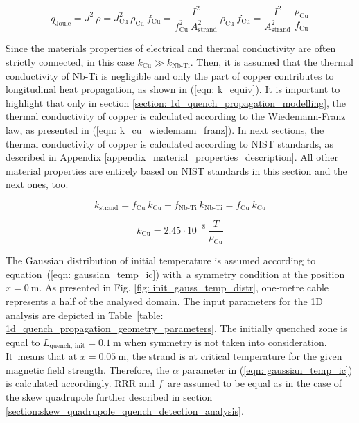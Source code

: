 \begin{equation}
    q_\text{Joule} = J^2~\rho = J_\text{Cu}^2~\rho_\text{Cu}~f_\text{Cu} = \frac{I^2}{f_\text{Cu}^2~A_\text{strand}^2}~\rho_\text{Cu}~f_\text{Cu} = \frac{I^2}{A_\text{strand}^2}~\frac{\rho_\text{Cu}}{f_\text{Cu}} 
    \label{eqn: p_dens_equiv}
\end{equation}

Since the materials properties of electrical and thermal conductivity are often strictly connected, in this case $k_\text{Cu} \gg k_\text{Nb-Ti}$. Then, it is assumed that the thermal conductivity of Nb-Ti is negligible and only the part of copper contributes to longitudinal heat propagation, as shown in (\ref{eqn: k_equiv}). It is important to highlight that only in section \ref{section: 1d_quench_propagation_modelling}, the thermal conductivity of copper is calculated according to the Wiedemann-Franz law, as presented in (\ref{eqn: k_cu_wiedemann_franz}). In next sections, the thermal conductivity of copper is calculated according to NIST standards, as described in Appendix \ref{appendix_material_properties_description}. All other material properties are entirely based on NIST standards in this section and the next ones, too.

\begin{equation}
    k_\text{strand} = f_\text{Cu} ~ k_\text{Cu} + f_\text{Nb-Ti} ~ k_\text{Nb-Ti} =  f_\text{Cu} ~ k_\text{Cu}
    \label{eqn: k_equiv}
\end{equation}

\begin{equation}
    k_\text{Cu} = 2.45 \cdot 10^{-8} ~ \frac{T}{\rho_\text{Cu}}
    \label{eqn: k_cu_wiedemann_franz}
\end{equation}

The Gaussian distribution of initial temperature is assumed according to equation~(\ref{eqn: gaussian_temp_ic}) with~a symmetry condition at the position $x=0~\text{m}$. As presented in Fig. \ref{fig: init_gauss_temp_distr}, one-metre cable represents a half of the analysed domain. The input parameters for the 1D analysis are depicted in Table~\ref{table: 1d_quench_propagation_geometry_parameters}. The initially quenched zone is equal to $L_\text{quench, init}= 0.1~\text{m}$ when symmetry is not taken into consideration. It~means that at $x=0.05~\text{m}$, the strand is at critical temperature for the given magnetic field strength. Therefore, the $\alpha$ parameter in (\ref{eqn: gaussian_temp_ic}) is calculated accordingly. RRR and $f$~are assumed to be equal as in the case of the skew quadrupole further described in section \ref{section:skew_quadrupole_quench_detection_analysis}. 

